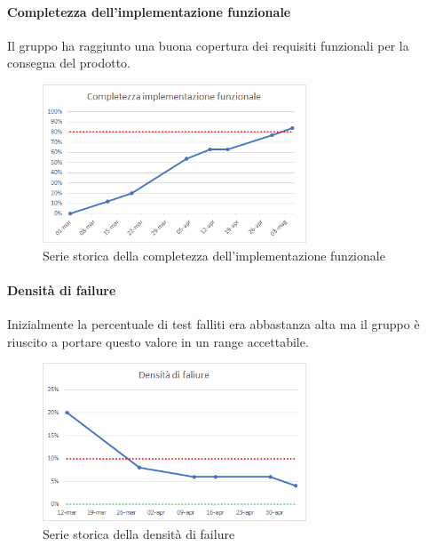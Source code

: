     \paragraph{Completezza dell'implementazione funzionale} \Spazio
    Il gruppo ha raggiunto una buona copertura dei requisiti funzionali per la consegna del prodotto.
    \begin{figure}[H]
    	\centering 
    	\includegraphics[width=0.7\textwidth]{Images/completezza-funzionale.png}
    	\caption{Serie storica della completezza dell'implementazione funzionale}
    	\label{cf} 
    \end{figure}
     \paragraph{Densità di failure} \Spazio
    Inizialmente la percentuale di test falliti era abbastanza alta ma il gruppo è riuscito a portare questo valore in un range accettabile.
    \begin{figure}[H]
    	\centering 
    	\includegraphics[width=0.7\textwidth]{Images/fail.png}
    	\caption{Serie storica della densità di failure}
    	\label{fail} 
    \end{figure} 
